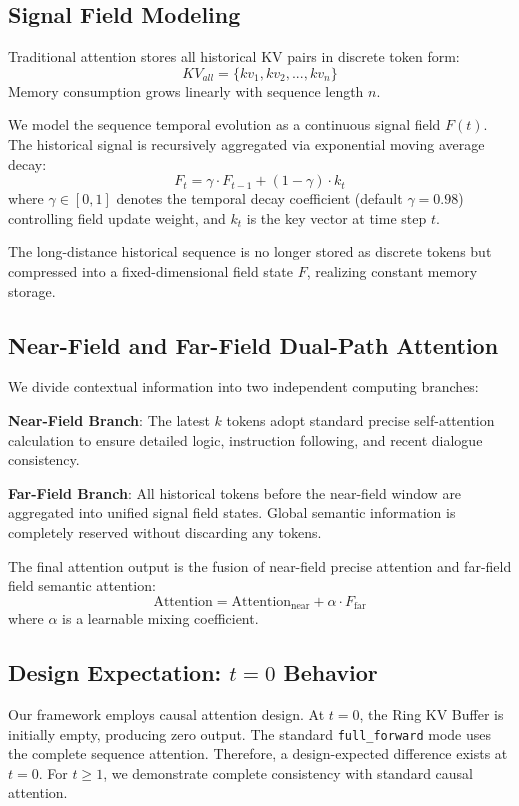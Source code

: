 \documentclass{article}
\begin{document}
\subsection{Signal Field Modeling}
Traditional attention stores all historical KV pairs in discrete token form:
\[
KV_{all} = \{kv_1, kv_2, ..., kv_n\}
\]
Memory consumption grows linearly with sequence length $n$.

We model the sequence temporal evolution as a continuous signal field $F(t)$. The historical signal is recursively aggregated via exponential moving average decay:
\[
F_t = \gamma \cdot F_{t-1} + (1-\gamma) \cdot k_t
\]
where $\gamma \in [0, 1]$ denotes the temporal decay coefficient (default $\gamma = 0.98$) controlling field update weight, and $k_t$ is the key vector at time step $t$.

The long-distance historical sequence is no longer stored as discrete tokens but compressed into a fixed-dimensional field state $F$, realizing constant memory storage.

\subsection{Near-Field and Far-Field Dual-Path Attention}
We divide contextual information into two independent computing branches:

\textbf{Near-Field Branch}: The latest $k$ tokens adopt standard precise self-attention calculation to ensure detailed logic, instruction following, and recent dialogue consistency.

\textbf{Far-Field Branch}: All historical tokens before the near-field window are aggregated into unified signal field states. Global semantic information is completely reserved without discarding any tokens.

The final attention output is the fusion of near-field precise attention and far-field field semantic attention:
\[
\text{Attention} = \text{Attention}_{\text{near}} + \alpha \cdot F_{\text{far}}
\]
where $\alpha$ is a learnable mixing coefficient.

\subsection{Design Expectation: $t=0$ Behavior}
Our framework employs causal attention design. At $t=0$, the Ring KV Buffer is initially empty, producing zero output. The standard \texttt{full\_forward} mode uses the complete sequence attention. Therefore, a design-expected difference exists at $t=0$. For $t \geq 1$, we demonstrate complete consistency with standard causal attention.
\end{document}
